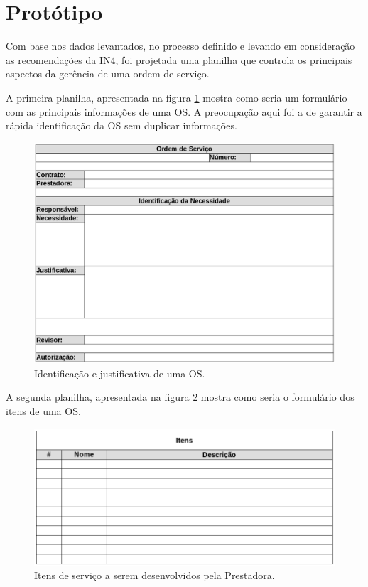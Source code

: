\section{Protótipo}

Com base nos dados levantados, no processo definido e levando em consideração
as recomendações da IN4, foi projetada uma planilha que controla os principais
aspectos da gerência de uma ordem de serviço.

A primeira planilha, apresentada na figura \ref{fig:prot_geral} mostra como
seria um formulário com as principais informações de uma OS. A preocupação aqui
foi a de garantir a rápida identificação da OS sem duplicar informações.

\begin{figure}[h]
  \includegraphics[width=1.0\textwidth,natwidth=500,natheight=150]{figures/prot_geral.png}
  \caption{Identificação e justificativa de uma OS.}
  \label{fig:prot_geral}
\end{figure}

A segunda planilha, apresentada na figura \ref{fig:prot_itens} mostra como seria
o formulário dos itens de uma OS.

\begin{figure}[h]
  \includegraphics[width=1.0\textwidth,natwidth=500,natheight=150]{figures/prot_itens.png}
  \caption{Itens de serviço a serem desenvolvidos pela Prestadora.}
  \label{fig:prot_itens}
\end{figure}

